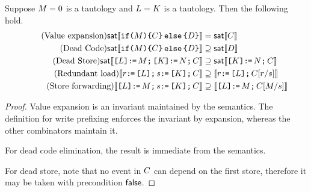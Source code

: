 \begin{lemma}
  Suppose $\aExp=0$ is a tautology and $\cExp=\dExp$ is a tautology.   Then the following hold.
  \begin{align*}
\tag{Value expansion}
  \fsat\sem{\IF{\aExp}\THEN\aCmd\ELSE\bCmd\FI} &=
  \fsat\sem{\aCmd}  \\
  \tag{Dead Code} 
  \fsat\sem{\IF{\aExp}\THEN\aCmd\ELSE\bCmd\FI} &\supseteq 
  \fsat\sem{\bCmd} \\
  \tag{Dead Store} 
  \fsat\sem{\REF{\cExp} \GETS \aExp \SEMI \REF{\dExp} \GETS \bExp \SEMI \aCmd} &\supseteq 
  \fsat\sem{\REF{\dExp} \GETS \bExp \SEMI \aCmd}\\    
  \tag{Redundant load}
  \sem{\aReg \GETS \REF{\cExp} \SEMI \bReg \GETS \REF{\dExp}  \SEMI \aCmd} &\supseteq
  \sem{\aReg \GETS \REF{\cExp} \SEMI \aCmd[\aReg/\bReg]} \\
  \tag{Store forwarding} 
  \sem{\REF{\cExp} \GETS \aExp \SEMI \bReg \GETS \REF{\dExp} \SEMI \aCmd} &\supseteq 
  \sem{\REF{\cExp} \GETS \aExp \SEMI \aCmd[\aExp/\bReg]}
\end{align*}
\begin{proof}
  Value expansion is an invariant maintained by the semantics.  The definition for write prefixing enforces the invariant by expansion, whereas the other combinators maintain it.

  For dead code elimination, the result is immediate from the semantics.
  
  For dead store, note that no event in $\aCmd$ can depend on the first store,
  therefore it may be taken with precondition $\FALSE$.
  

\end{proof}
\end{lemma}
